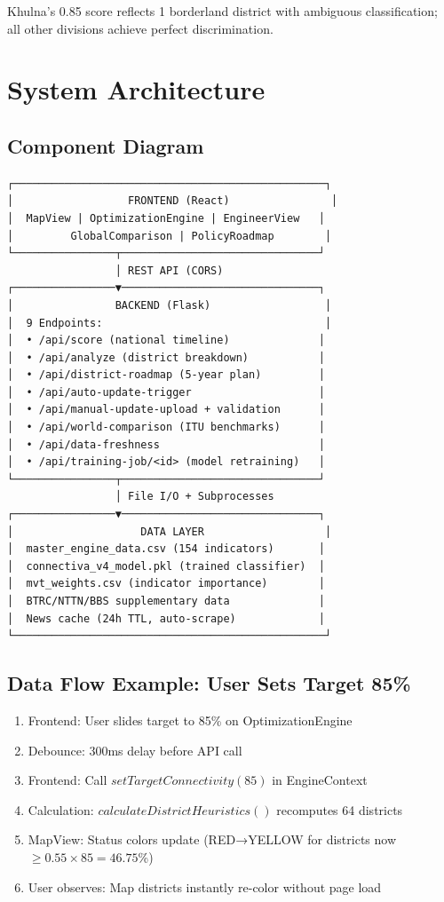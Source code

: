 \documentclass[11pt,a4paper]{article}
\begin{document}
Khulna's 0.85 score reflects 1 borderland district with ambiguous classification; all other divisions achieve perfect discrimination.

\section{System Architecture}

\subsection{Component Diagram}

\begin{verbatim}
┌─────────────────────────────────────────────────┐
│                  FRONTEND (React)                │
│  MapView | OptimizationEngine | EngineerView   │
│         GlobalComparison | PolicyRoadmap        │
└────────────────┬───────────────────────────────┘
                 │ REST API (CORS)
┌────────────────▼───────────────────────────────┐
│                BACKEND (Flask)                  │
│  9 Endpoints:                                   │
│  • /api/score (national timeline)              │
│  • /api/analyze (district breakdown)           │
│  • /api/district-roadmap (5-year plan)         │
│  • /api/auto-update-trigger                    │
│  • /api/manual-update-upload + validation      │
│  • /api/world-comparison (ITU benchmarks)      │
│  • /api/data-freshness                         │
│  • /api/training-job/<id> (model retraining)   │
└────────────────┬───────────────────────────────┘
                 │ File I/O + Subprocesses
┌────────────────▼───────────────────────────────┐
│                    DATA LAYER                   │
│  master_engine_data.csv (154 indicators)       │
│  connectiva_v4_model.pkl (trained classifier)  │
│  mvt_weights.csv (indicator importance)        │
│  BTRC/NTTN/BBS supplementary data              │
│  News cache (24h TTL, auto-scrape)             │
└─────────────────────────────────────────────────┘
\end{verbatim}

\subsection{Data Flow Example: User Sets Target 85\%}

\begin{enumerate}
  \item Frontend: User slides target to 85\% on OptimizationEngine
  \item Debounce: 300ms delay before API call
  \item Frontend: Call $setTargetConnectivity(85)$ in EngineContext
  \item Calculation: $calculateDistrictHeuristics()$ recomputes 64 districts
  \item MapView: Status colors update (RED→YELLOW for districts now $\geq 0.55 \times 85 = 46.75$\%)
  \item User observes: Map districts instantly re-color without page load
\end{enumerate}
\end{document}
